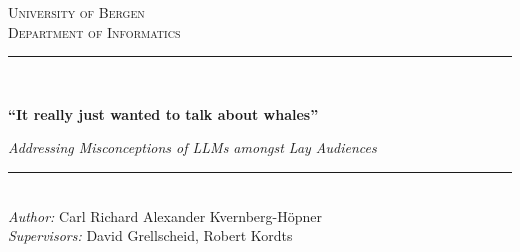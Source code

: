 \begin{titlepage}

\newcommand{\HRule}{\rule{\linewidth}{0.5mm}} %

\center %
 

\textsc{\LARGE University of Bergen \\ Department of Informatics}\\[1.5cm] %


\HRule \\[0.5cm]
\begin{Huge}
	\bfseries{``It really just wanted to talk about whales''}\\[0.7cm] %
\end{Huge}
\Large
\textit{Addressing Misconceptions of LLMs amongst Lay Audiences}\\[0.7cm]

\HRule \\[0.5cm]


\large \emph{Author:} Carl Richard Alexander Kvernberg-Höpner\\
\large \emph{Supervisors:} David Grellscheid, Robert Kordts\\[2cm]



\end{titlepage}
